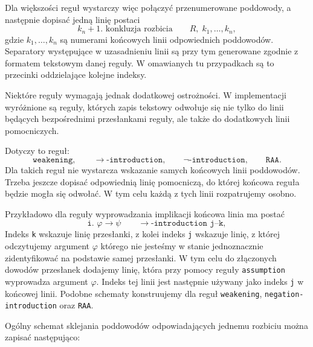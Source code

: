 \documentclass[shortabstract]{iithesis}
\theoremstyle{definition}
\theoremstyle{remark}
\theoremstyle{plain}
\begin{document}
Dla większości reguł wystarczy więc połączyć przenumerowane poddowody, a następnie
dopisać jedną linię postaci
\[
k_n+1\texttt{. }\text{konkluzja rozbicia}
\qquad
R,\; k_1, \ldots, k_n,
\]
gdzie \(k_1,\ldots,k_n\) są numerami końcowych linii odpowiednich poddowodów. Separatory występujące
w uzasadnieniu linii są przy tym generowane zgodnie z formatem tekstowym danej
reguły. W omawianych tu przypadkach są to przecinki oddzielające kolejne indeksy.

Niektóre reguły wymagają jednak dodatkowej ostrożności. W implementacji wyróżnione
są reguły, których zapis tekstowy odwołuje się nie tylko do linii będących
bezpośrednimi przesłankami reguły, ale także do dodatkowych linii pomocniczych.


Dotyczy to reguł:
\[
\texttt{weakening}, \qquad
\to\texttt{-introduction}, \qquad
\neg\texttt{-introduction}, \qquad
\texttt{RAA}.
\]
Dla takich reguł nie wystarcza wskazanie samych końcowych linii poddowodów.
Trzeba jeszcze dopisać odpowiednią linię pomocniczą, do której końcowa reguła będzie
mogła się odwołać. W tym celu każdą z tych linii rozpatrujemy osobno.

Przykładowo dla reguły wyprowadzania implikacji końcowa linia ma postać
\[
\texttt{i. }
    \varphi \to \psi
    \qquad
    \to\texttt{-introduction j–k}, 
\]
Indeks \texttt{k} wskazuje linię przesłanki, z kolei indeks \texttt{j} wskazuje linię,
z której odczytujemy argument \(\varphi\) którego nie jesteśmy w stanie jednoznacznie zidentyfikować
na podstawie samej przesłanki. W tym celu do złączonych dowodów przesłanek dodajemy linię, która przy pomocy reguły \texttt{assumption}
wyprowadza argument \(\varphi\). Indeks tej linii jest następnie używany jako indeks \texttt{j} w końcowej linii.
Podobne schematy konstruujemy dla reguł \texttt{weakening}, \texttt{negation-introduction} oraz \texttt{RAA}.


Ogólny schemat sklejania poddowodów odpowiadających jednemu rozbiciu można
zapisać następująco:
\end{document}
